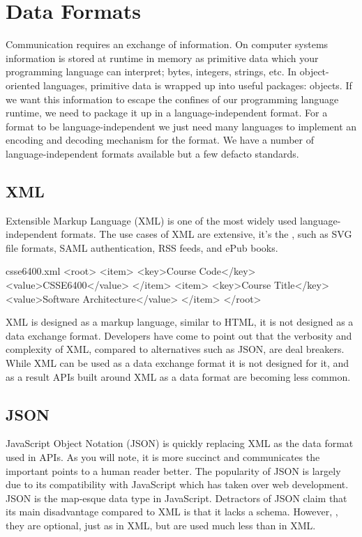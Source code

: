 \documentclass{csse4400}
\begin{document}
\section{Data Formats}
Communication requires an exchange of information.
On computer systems information is stored at runtime in memory as primitive data which your programming language can interpret;
bytes, integers, strings, etc.
In object-oriented languages,
primitive data is wrapped up into useful packages: objects.
If we want this information to escape the confines of our programming language runtime,
we need to package it up in a language-independent format.
For a format to be language-independent we just need many languages to implement an encoding and decoding mechanism for the format.
We have a number of language-independent formats available but a few defacto standards.

\subsection{XML}
Extensible Markup Language (XML) is one of the most widely used language-independent formats.
The use cases of XML are extensive,
it's the ,
such as SVG file formats, SAML authentication, RSS feeds, and ePub books.

\begin{code}[language=xml]{csse6400.xml}
<root>
  <item>
    <key>Course Code</key>
    <value>CSSE6400</value>
  </item>
  <item>
    <key>Course Title</key>
    <value>Software Architecture</value>
  </item>
</root>
\end{code}

XML is designed as a markup language, similar to HTML,
it is not designed as a data exchange format.
Developers have come to point out that the verbosity and complexity of XML,
compared to alternatives such as JSON, are deal breakers.
While XML can be used as a data exchange format it is not designed for it,
and as a result APIs built around XML as a data format are becoming less common.

\subsection{JSON}
JavaScript Object Notation (JSON) is quickly replacing XML as the data format used in APIs.
As you will note, it is more succinct and communicates the important points to a human reader better.
The popularity of JSON is largely due to its compatibility with JavaScript which has taken over web development.
JSON is the map-esque data type in JavaScript.
Detractors of JSON claim that its main disadvantage compared to XML is that it lacks a schema.
However, ,
they are optional, just as in XML, but are used much less than in XML.
\end{document}
